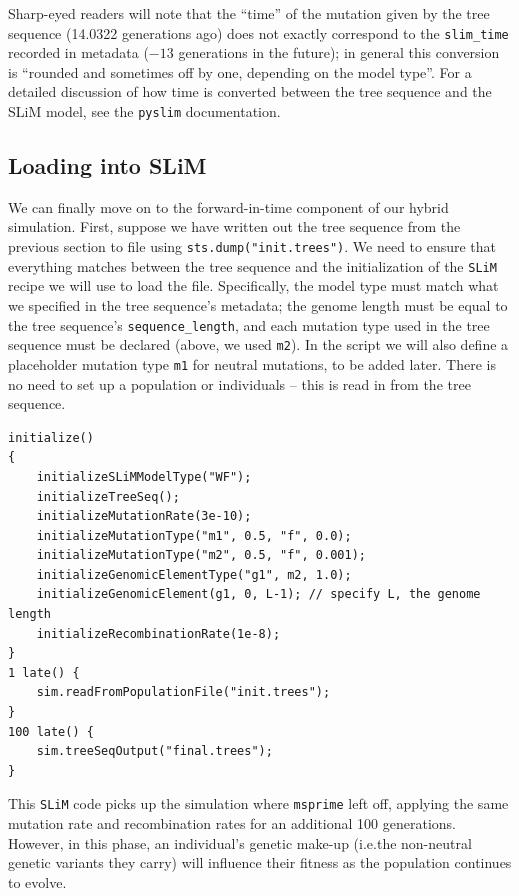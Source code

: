 \documentclass[12pt]{article}
\newcommand{\msprime}[0]{\texttt{msprime}\xspace}
\newcommand{\slim}[0]{\texttt{SLiM}\xspace}
\newcommand{\pyslim}[0]{\texttt{pyslim}\xspace}
\newcommand*{\ie}{i.e.\xcomma}
\begin{document}
Sharp-eyed readers will note that the ``time'' of the mutation given by the tree sequence (14.0322 generations ago) does not exactly
correspond to the \verb|slim_time| recorded in metadata ($-13$ generations in the future); in general this conversion is ``rounded and sometimes
off by one, depending on the model type''. For a detailed discussion of how time is converted between the tree sequence and the SLiM
model, see the \pyslim documentation.

\subsection*{Loading into SLiM}

We can finally move on to the forward-in-time component of our hybrid simulation.
First, suppose we have written out the tree sequence from the previous section to file
using \verb|sts.dump("init.trees")|.
We need to ensure that everything matches
between the tree sequence and the initialization of the \slim recipe we will use to load the file.
Specifically, the model type must match what we specified in the tree sequence's metadata;
the genome length must be equal to the tree sequence's \verb|sequence_length|,
and each mutation type used in the tree sequence must be declared (above, we used \verb|m2|).
In the script we will also define a placeholder mutation type \verb|m1| for neutral mutations, to be added later.
There is no need to set up a population or individuals -- this is read in from the tree sequence.
\begin{lstlisting}[language=slim, style=slimstyle, breaklines=true]
initialize()
{
    initializeSLiMModelType("WF");
    initializeTreeSeq();
    initializeMutationRate(3e-10);
    initializeMutationType("m1", 0.5, "f", 0.0);
    initializeMutationType("m2", 0.5, "f", 0.001);
    initializeGenomicElementType("g1", m2, 1.0);
    initializeGenomicElement(g1, 0, L-1); // specify L, the genome length
    initializeRecombinationRate(1e-8);
}
1 late() { 
    sim.readFromPopulationFile("init.trees");
}
100 late() {
    sim.treeSeqOutput("final.trees");
}
\end{lstlisting}
This \slim code picks up the simulation where \msprime left off, applying the same mutation rate and recombination rates
for an additional 100 generations.
However, in this phase, an individual's genetic make-up (\ie the non-neutral genetic variants they carry)
will influence their fitness as the population continues to evolve.
\end{document}
